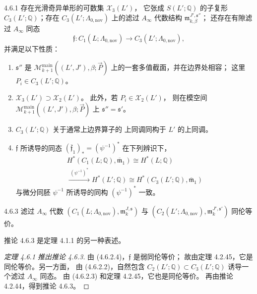 \begin{theorem}{4.6.1}\label{thm:4-6-1}
存在光滑奇异单形的可数集 $\mathcal X_3(L')$，
它张成 $S(L';\mathbb Q)$ 的子复形
$C_3(L';\mathbb Q)$；存在
$C_3(L';\Lambda_{0,\mathrm{nov}})$ 上的滤过
$A_\infty$ 代数结构
$\mathfrak m_{k,\beta}^{J',\mathfrak s''}$；
还存在有隙滤过 $A_\infty$ 同态
\[
 \mathfrak f\colon C_1(L;\Lambda_{0,\mathrm{nov}})
 \longrightarrow C_3(L';\Lambda_{0,\mathrm{nov}}),
\]
并满足以下性质：
\begin{enumerate}[label=\textup{(4.6.2.\arabic*)},leftmargin=5.9em]
 \item
 $\mathfrak s''$ 是
 $\mathcal M_{k+1}^{\mathrm{main}}
 ((L',J'),\beta;\vec P)$
 上的一套多值截面，并在边界处相容；
 这里 $P_i\in C_3(L';\mathbb Q)$。
 \item
 $\mathcal X_3(L')\supset\mathcal X_2(L')$。
 此外，若 $P_i\in\mathcal X_2(L')$，
 则在模空间
 $\mathcal M_{k+1}^{\mathrm{main}}
 ((L',J'),\beta;\vec P)$ 上
 $\mathfrak s''=\mathfrak s'$。
 \item
 $C_3(L';\mathbb Q)$ 关于通常上边界算子的
 上同调同构于 $L'$ 的上同调。
 \item
 $\mathfrak f$ 所诱导的同态
 $(\overline{\mathfrak f}_1)_*=(\psi^{-1})^*$
 在下列辨识下，
 \[
 \begin{gathered}
 H^*(C_1(L;\mathbb Q),\overline{\mathfrak m}_1)
 \cong H^*(L;\mathbb Q)\\
 \xrightarrow{\;(\psi^{-1})^*\;}
 H^*(L';\mathbb Q)
 \cong H^*(C_3(L';\mathbb Q),
 \overline{\mathfrak m}_1)
 \end{gathered}
 \]
 与微分同胚 $\psi^{-1}$ 所诱导的同构
 $(\psi^{-1})^*$ 一致。
\end{enumerate}
\end{theorem}

\begin{corollary}{4.6.3}\label{cor:4-6-3}
滤过 $A_\infty$ 代数
$(C_1(L;\Lambda_{0,\mathrm{nov}}),
\mathfrak m_k^{J,\mathfrak s})$
与
$(C_2(L';\Lambda_{0,\mathrm{nov}}),
\mathfrak m_k^{J',\mathfrak s'})$
同伦等价。
\end{corollary}
推论 4.6.3 是定理 4.1.1 的另一种表述。

\begin{proof}[定理 4.6.1 推出推论 4.6.3]
由 (4.6.2.4)，$\mathfrak f$ 是弱同伦等价；
故由定理 4.2.45，它是同伦等价。另一方面，
由 (4.6.2.2)，自然包含
$C_2(L';\mathbb Q)\subset C_3(L';\mathbb Q)$
诱导一个滤过 $A_\infty$ 同态。
由 (4.6.2.3) 和定理 4.2.45，它也是同伦等价。
再由推论 4.2.44，得到推论 4.6.3。
\end{proof}

